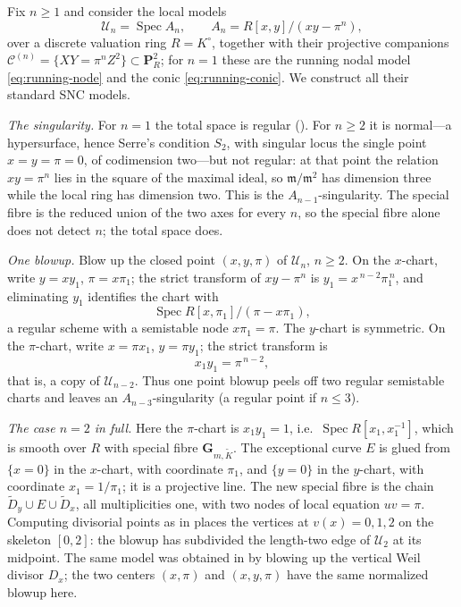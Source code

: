 \begin{example}
\label{ex:snc-chain-models}
Fix $n\geq1$ and consider the local models
\[
    \mathcal U_n=\operatorname{Spec}A_n,
    \qquad A_n=R[x,y]/(xy-\pi^n),
\]
over a discrete valuation ring $R=K^\circ$, together with their projective
companions $\mathcal C^{(n)}=\{XY=\pi^nZ^2\}\subset\mathbf P^2_R$; for
$n=1$ these are the running nodal model \eqref{eq:running-node} and the
conic \eqref{eq:running-conic}.  We construct all their standard SNC
models.

\emph{The singularity.}  For $n=1$ the total space is regular
().  For $n\geq2$ it is normal---a hypersurface, hence
Serre's condition $S_2$, with singular locus the single point
$x=y=\pi=0$, of codimension two---but not regular: at that point the
relation $xy=\pi^n$ lies in the square of the maximal ideal, so
$\mathfrak m/\mathfrak m^2$ has dimension three while the local ring has
dimension two.  This is the $A_{n-1}$-singularity.  The special fibre is
the reduced union of the two axes for every $n$, so the special fibre alone
does not detect $n$; the total space does.

\emph{One blowup.}  Blow up the closed point $(x,y,\pi)$ of
$\mathcal U_n$, $n\geq2$.  On the $x$-chart, write $y=xy_1$, $\pi=x\pi_1$;
the strict transform of $xy-\pi^n$ is
$y_1=x^{\,n-2}\pi_1^{\,n}$, and eliminating $y_1$ identifies the chart with
\[
     \operatorname{Spec}R[x,\pi_1]/(\pi-x\pi_1),
\]
a regular scheme with a semistable node $x\pi_1=\pi$.  The $y$-chart is
symmetric.  On the $\pi$-chart, write $x=\pi x_1$, $y=\pi y_1$; the strict
transform is
\[
     x_1y_1=\pi^{\,n-2},
\]
that is, a copy of $\mathcal U_{n-2}$.  Thus one point blowup peels off
two regular semistable charts and leaves an $A_{n-3}$-singularity
(a regular point if $n\leq3$).

\emph{The case $n=2$ in full.}  Here the $\pi$-chart is
$x_1y_1=1$, i.e.\ $\operatorname{Spec}R[x_1,x_1^{-1}]$, which is smooth
over $R$ with special fibre $\mathbf G_{m,\widetilde K}$.  The exceptional
curve $E$ is glued from $\{x=0\}$ in the $x$-chart, with coordinate
$\pi_1$, and $\{y=0\}$ in the $y$-chart, with coordinate $x_1=1/\pi_1$; it
is a projective line.  The new special fibre is the chain
$\widetilde D_y\cup E\cup\widetilde D_x$, all multiplicities one, with two
nodes of local equation $uv=\pi$.  Computing divisorial points as in
 places the vertices at
$v(x)=0,1,2$ on the skeleton $[0,2]$: the blowup has subdivided the length-two
edge of $\mathcal U_2$ at its midpoint.  The same model was obtained in
 by blowing up the vertical Weil
divisor $D_x$; the two centers $(x,\pi)$ and $(x,y,\pi)$ have the same
normalized blowup here.


\end{example}
